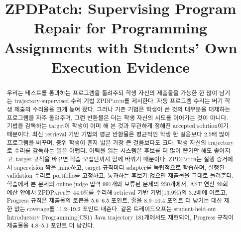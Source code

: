 \documentclass[10pt,conference]{IEEEtran}
\title{ZPDPatch: Supervising Program Repair for Programming Assignments with Students' Own Execution Evidence}
\author{}
\begin{document}
\maketitle
\begin{abstract}
우리는 테스트를 통과하는 프로그램을 돌려주되 학생 자신의 제출물을 가능한 한 많이 남기는 trajectory-supervised 수리 기법 \textsc{ZPDPatch}를 제시한다. 자동 프로그램 수리는 버기 학생 제출의 수리율을 크게 높여 왔다. 그러나 기존 기법은 학생이 쓴 것의 대부분을 대체하는 프로그램을 자주 돌려주며, 그런 반환물은 더는 학생 자신의 시도를 이어가는 것이 아니다. 기법을 감독하는 target이 학생이 이미 해 본 것과 무관하게 정해진 accepted solution이기 때문이다. 최신 retrieval 기반 기법의 평균 반환물은 평균적인 학생 한 걸음보다 2.5배 많이 프로그램을 바꾸며, 중위 학생이 혼자 밟은 가장 큰 걸음보다도 크다. 학생 자신의 trajectory로 수리를 감독하는 일은 어렵다. 이력을 읽는 시스템은 후보를 더 많이 뽑기만 해도 좋아지고, target 규칙을 바꾸면 학습 모집단까지 함께 바뀌기 때문이다. \textsc{ZPDPatch}는 실행 증거에서 supervision 짝을 mine하고, target 규칙마다 adapter를 독립적으로 학습하며, 실행된 validation 수리로 portfolio를 고정하고, 통과하는 후보가 없으면 제출물을 그대로 돌려준다. 학습에서 본 문제의 online-judge 입력 997개와 보류된 문제의 250개에서, AST 연산 20회 예산 안에서 \textsc{ZPDPatch}는 44.0\%를 수리해 retrieval 기반 기법(13.9\%)의 3.2배에 이르고, Progress 규칙은 제출물의 토큰을 5.6--6.5 포인트, 줄을 8.9--10.4 포인트 더 남기는 대신 제한 없는 coverage를 11.2--19.2 포인트 내준다. 같은 트레이드오프는 student-held-out Introductory Programming(CS1) Java trajectory 181개에서도 재현되어, Progress 규칙이 제출물을 4.8--5.1 포인트 더 남긴다.

\end{abstract}
\end{document}
